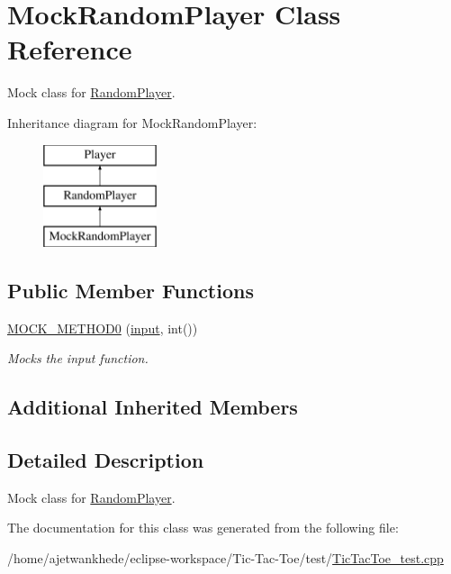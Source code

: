 \hypertarget{classMockRandomPlayer}{}\section{Mock\+Random\+Player Class Reference}
\label{classMockRandomPlayer}


Mock class for \mbox{\hyperlink{classRandomPlayer}{Random\+Player}}.  


Inheritance diagram for Mock\+Random\+Player\+:\begin{figure}[H]
\begin{center}
\leavevmode
\includegraphics[height=3.000000cm]{classMockRandomPlayer}
\end{center}
\end{figure}
\subsection*{Public Member Functions}
\begin{DoxyCompactItemize}
\item 
\mbox{\label{classMockRandomPlayer_a0b9c5397b7bd4a6e116b7b177abf1490}} 
\mbox{\hyperlink{classMockRandomPlayer_a0b9c5397b7bd4a6e116b7b177abf1490}{M\+O\+C\+K\+\_\+\+M\+E\+T\+H\+O\+D0}} (\mbox{\hyperlink{classRandomPlayer_a4b252647e976a08c1717d8db78bec23d}{input}}, int())
\begin{DoxyCompactList}\small\item\em Mocks the input function. \end{DoxyCompactList}\end{DoxyCompactItemize}
\subsection*{Additional Inherited Members}


\subsection{Detailed Description}
Mock class for \mbox{\hyperlink{classRandomPlayer}{Random\+Player}}. 

The documentation for this class was generated from the following file\+:\begin{DoxyCompactItemize}
\item 
/home/ajetwankhede/eclipse-\/workspace/\+Tic-\/\+Tac-\/\+Toe/test/\mbox{\hyperlink{TicTacToe__test_8cpp}{Tic\+Tac\+Toe\+\_\+test.\+cpp}}\end{DoxyCompactItemize}
